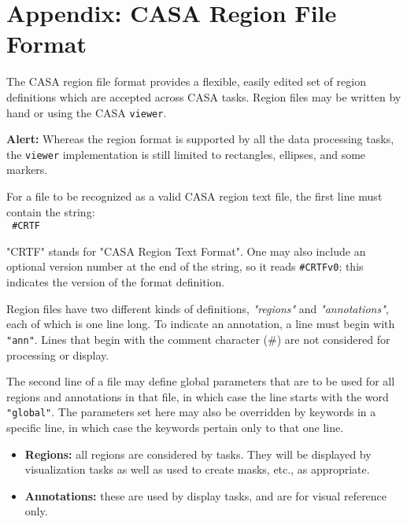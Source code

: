 


\chapter[Appendix: CASA Region File Format]
         {Appendix: CASA Region File Format}
\label{chapter:regionformat}


The CASA region file format provides a flexible, easily edited set of
region definitions which are accepted across CASA tasks.  Region files
may be written by hand or using the CASA {\tt viewer}.

{\bf Alert:} Whereas the region format is supported by all the data
  processing tasks, the {\tt viewer} implementation is still limited
  to rectangles, ellipses, and some markers.


For a file to be recognized as a valid CASA region text file, the
first line must contain the string:\\

{\tt 
\#CRTF
}


"CRTF" stands for "CASA Region Text Format".  One may also include an
optional version number at the end of the string, so it reads
{\tt \#CRTFv0}; this indicates the version of the format
definition.

Region files have two different kinds of definitions, {\it "regions"} and
{\it "annotations"}, each of which is one line long. To indicate an
annotation, a line must begin with {\tt "ann"}.  Lines that begin with the
comment character (\#) are not considered for processing or display.

The second line of a file may define global parameters that are to be
used for all regions and annotations in that file, in which case the
line starts with the word {\tt "global"}.  The parameters set here may
also be overridden by keywords in a specific line, in which case the
keywords pertain only to that one line.

\begin{itemize}

\item {\bf Regions:} all regions are considered by tasks.  They will
  be displayed by visualization tasks as well as used to create masks,
  etc., as appropriate.

\item {\bf Annotations:} these are used by display tasks, and are for
  visual reference only.

\end{itemize}

